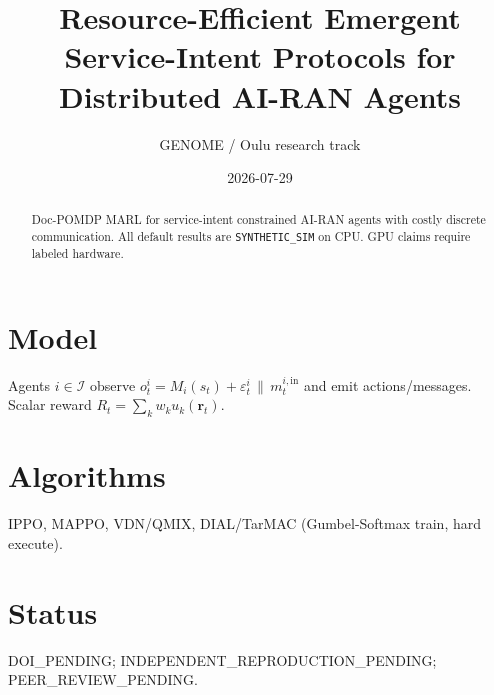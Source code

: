 \documentclass{article}
\title{Resource-Efficient Emergent Service-Intent Protocols for Distributed AI-RAN Agents}
\author{GENOME / Oulu research track}
\date{2026-07-29}
\begin{document}
\maketitle
\begin{abstract}
Doc-POMDP MARL for service-intent constrained AI-RAN agents with costly discrete communication.
All default results are \texttt{SYNTHETIC\_SIM} on CPU. GPU claims require labeled hardware.
\end{abstract}
\section{Model}
Agents $i\in\mathcal{I}$ observe $o^i_t=M_i(s_t)+\varepsilon^i_t\,\|\,m^{i,\mathrm{in}}_t$ and emit actions/messages.
Scalar reward $R_t=\sum_k w_k u_k(\mathbf{r}_t)$.
\section{Algorithms}
IPPO, MAPPO, VDN/QMIX, DIAL/TarMAC (Gumbel-Softmax train, hard execute).
\section{Status}
DOI\_PENDING; INDEPENDENT\_REPRODUCTION\_PENDING; PEER\_REVIEW\_PENDING.
\end{document}
